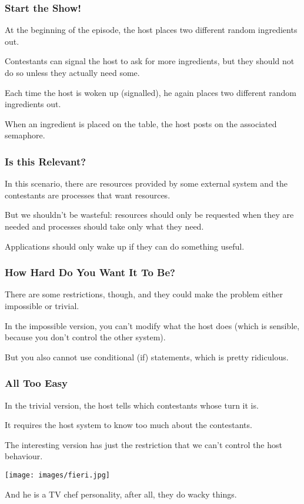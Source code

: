\begin{frame}
	\frametitle{Start the Show!}
	At the beginning of the episode, the host places two different random ingredients out.

	Contestants can signal the host to ask for more ingredients, but they should not do so unless they actually need some.

	Each time the host is woken up (signalled), he again places two different random ingredients out.

	When an ingredient is placed on the table, the host posts on the associated semaphore.

\end{frame}

\begin{frame}
	\frametitle{Is this Relevant?}

	In this scenario, there are resources provided by some external system and the contestants are processes that want resources.

	But we shouldn't be wasteful: resources should only be requested when they are needed and processes should take only what they need.

	Applications should only wake up if they can do something useful.

\end{frame}

\begin{frame}
	\frametitle{How Hard Do You Want It To Be?}

	There are some restrictions, though, and they could make the problem either impossible or trivial.

	In the impossible version, you can't modify what the host does (which is sensible, because you don't control the other system).

	But you also cannot use conditional (if) statements, which is pretty ridiculous.

\end{frame}

\begin{frame}
	\frametitle{All Too Easy}

	In the trivial version, the host tells which contestants whose turn it is.

	It requires the host system to know too much about the contestants.

	The interesting version has just the restriction that we can't control the host behaviour.



	\begin{center}
		\texttt{[image: images/fieri.jpg]}
	\end{center}

	And he is a TV chef personality, after all, they do wacky things.


\end{frame}


